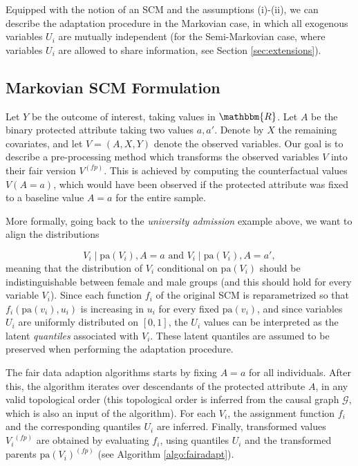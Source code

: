\documentclass[
  nojss]{jss}
\begin{document}
Equipped with the notion of an SCM and the assumptions (i)-(ii), we can
describe the adaptation procedure in the Markovian case, in which all
exogenous variables \(U_i\) are mutually independent (for the
Semi-Markovian case, where variables \(U_i\) are allowed to share
information, see Section \ref{sec:extensions}).

\hypertarget{markovian-scm-formulation}{%
\subsection{Markovian SCM Formulation}\label{markovian-scm-formulation}}

Let \(Y\) be the outcome of interest, taking values in \(\mathbbm{R}\).
Let \(A\) be the binary protected attribute taking two values \(a, a'\).
Denote by \(X\) the remaining covariates, and let \(V = (A, X, Y)\)
denote the observed variables. Our goal is to describe a pre-processing
method which transforms the observed variables \(V\) into their fair
version \( {V}^{(fp)}\). This is achieved by computing the
counterfactual values \(V(A = a)\), which would have been observed if
the protected attribute was fixed to a baseline value \(A = a\) for the
entire sample.

More formally, going back to the \emph{university admission} example
above, we want to align the distributions

\[V_i \mid \mathrm{pa}(V_i), A = a \text{ and } V_i \mid \mathrm{pa}(V_i), A = a',\]
meaning that the distribution of \(V_i\) conditional on
\(\mathrm{pa}(V_i)\) should be indistinguishable between female and male
groups (and this should hold for every variable \(V_i\)). Since each
function \(f_i\) of the original SCM is reparametrized so that
\(f_i(\mathrm{pa}(v_i), u_i)\) is increasing in \(u_i\) for every fixed
\(\mathrm{pa}(v_i)\), and since variables \(U_i\) are uniformly
distributed on \([0, 1]\), the \(U_i\) values can be interpreted as the
latent \emph{quantiles} associated with \(V_i\). These latent quantiles
are assumed to be preserved when performing the adaptation procedure.

The fair data adaption algorithms starts by fixing \(A = a\) for all
individuals. After this, the algorithm iterates over descendants of the
protected attribute \(A\), in any valid topological order (this
topological order is inferred from the causal graph \(\mathcal{G}\),
which is also an input of the algorithm). For each \(V_i\), the
assignment function \(f_i\) and the corresponding quantiles \(U_i\) are
inferred. Finally, transformed values \( {V_i}^{(fp)}\) are obtained by
evaluating \(f_i\), using quantiles \(U_i\) and the transformed parents
\( {\mathrm{pa}(V_i)}^{(fp)}\) (see Algorithm \ref{algo:fairadapt}).
\end{document}
